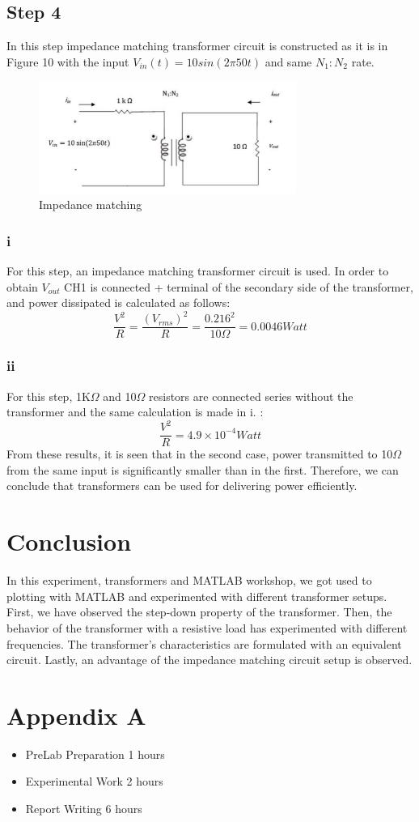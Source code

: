 \documentclass[letterpaper,12pt]{article}
\begin{document}
\subsection{Step 4}
In this step impedance matching transformer circuit is constructed as it is in Figure 10 with the input \(V_{in}(t) = 10sin(2\pi50t)\) and same \(N_1:N_2\) rate. 
\begin{figure}[H]
    \centering
    \includegraphics[width = 0.75\textwidth]{4.png}
    \caption{Impedance matching}
\end{figure} 

\subsubsection{i}
For this step, an impedance matching transformer circuit is used. In order to obtain \(V_{out}\) CH1 is connected + terminal of the secondary side of the transformer, and power dissipated is calculated as follows:
\[\frac{V^2}{R} = \frac{(V_{rms})^2}{R} = \frac{0.216^2}{10\Omega } = 0.0046 Watt\]   

\subsubsection{ii}
For this step, 1K\(\Omega \) and 10\(\Omega \) resistors are connected series without the transformer and the same calculation is made in i. :
\[\frac{V^2}{R} = 4.9 \times 10^{-4} Watt\]
From these results, it is seen that in the second case, power transmitted to 10\(\Omega \) from the same input is significantly smaller than in the first. Therefore, we can conclude that transformers can be used for delivering power efficiently. 

\section{Conclusion}
In this experiment, transformers and MATLAB workshop, we got used to plotting with MATLAB and experimented with different transformer setups. First, we have observed the step-down property of the transformer. Then, the behavior of the transformer with a resistive load has experimented with different frequencies. The transformer's characteristics are formulated with an equivalent circuit. Lastly, an advantage of the impedance matching circuit setup is observed.
\section*{Appendix A}
\begin{itemize}
    \item PreLab Preparation 1 hours
    \item Experimental Work 2  hours
    \item Report Writing 6 hours
\end{itemize}
\end{document}
